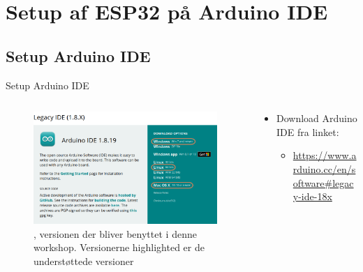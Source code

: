 \documentclass[aspectratio=169]{beamer}
\begin{document}
\section{Setup af ESP32 på Arduino IDE}
\begin{frame}
\end{frame}

\subsection{Setup Arduino IDE}
\begin{frame}{Setup Arduino IDE}
\begin{columns}
	\begin{column}{0.5\textwidth}
		\begin{figure}
  			\includegraphics[width=\textwidth,keepaspectratio=true]{assets/pictures/arduino-versions.png}
  			\caption{, versionen der bliver benyttet i denne workshop. Versionerne highlighted er de understøttede versioner}
  			\label{fig:arduino-versions}
		\end{figure}
	\end{column}
	\begin{column}{0.5\textwidth}
		\begin{textBox}
			\begin{itemize}
				\item Download Arduino IDE  fra linket:
				\begin{itemize}
					 \item \small\url{https://www.arduino.cc/en/software\#legacy-ide-18x}
				\end{itemize}
				\begin{itemize}

\end{itemize}
\end{itemize}
\end{textBox}
\end{column}
\end{columns}
\end{frame}
\end{document}
